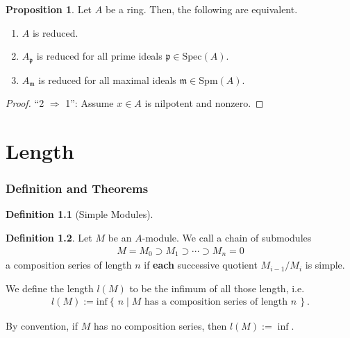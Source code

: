 \documentclass[a4paper]{book}
\theoremstyle{definition}
\newtheorem{definition}{Definition}[]
\newtheorem{proposition}[definition]{Proposition}
\newcommand{\makeset}[2]{\left\{\, #1 \mid #2 \,\right\}}
\begin{document}
\begin{thmbox}
    \begin{proposition}
        Let \(A\) be a ring. Then, the following are equivalent.
        \begin{enumerate}
            \item \(A\) is reduced.
            \item \(A_\mathfrak{p}\) is reduced for all prime ideals \(\mathfrak{p} \in \mathrm{Spec}(A)\).
            \item \(A_\mathfrak{m}\) is reduced for all maximal ideals \(\mathfrak{m} \in \mathrm{Spm}(A)\).
        \end{enumerate}
    \end{proposition}
\end{thmbox}
\begin{proof}
    ``2 \(\Rightarrow\) 1'': Assume \(x \in A\) is nilpotent and nonzero.
\end{proof}

\chapter{Length}
\subsection{Definition and Theorems}
\begin{defbox}
    \begin{definition}[Simple Modules]
        
    \end{definition}
\end{defbox}
\begin{defbox}
    \begin{definition}
        Let \(M\) be an \(A\)-{\color{mathobj}module}. We call a {\color{mathobj}chain} of {\color{mathobj}submodules}
        \begin{align*}
            M = M_0 \supset M_1 \supset \cdots \supset M_n = 0
        \end{align*}
        a {\color{maththen}composition series} of {\color{maththen}length} \(n\) if \textbf{each} successive {\color{mathobj}quotient} \(M_{i-1} / M_i\) is {\color{mathif}simple}.

        We define the {\color{maththen}length} \(l(M)\) to be the infimum of all those length, i.e.
        \begin{align*}
            l(M) := \mathrm{inf} \makeset{n}{M \text{ has a composition series of length } n} \text{.}
        \end{align*}

        By convention, if \(M\) has no composition series, then \(l(M) := \inf\).
    \end{definition}
\end{defbox}
\end{document}
